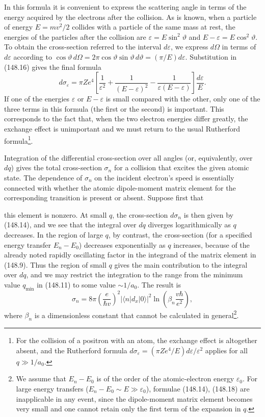 In this formula it is convenient to express the scattering angle in terms of
the energy acquired by the electrons after the collision. As is known, when a
particle of energy $E=mv^2/2$ collides with a particle of the same mass at
rest, the energies of the particles after the collision are
$\varepsilon=E\sin^2\vartheta$ and $E-\varepsilon=E\cos^2\vartheta$. To obtain
the cross-section referred to the interval $d\varepsilon$, we express
$d\Omega$ in terms of $d\varepsilon$ according to
$\cos\vartheta\,d\Omega=2\pi\cos\vartheta\sin\vartheta\,d\vartheta
=(\pi/E)d\varepsilon$. Substitution in (148.16) gives the final formula
\begin{equation}
 d\sigma_\varepsilon=\pi Ze^4\left[\frac1{\varepsilon^2}+\frac1{(E-\varepsilon)^2}
 -\frac1{\varepsilon(E-\varepsilon)}\right]\frac{d\varepsilon}{E}.
 \tag{148.17}
\end{equation}
If one of the energies $\varepsilon$ or $E-\varepsilon$ is small compared with
the other, only one of the three terms in this formula (the first or the
second) is important. This corresponds to the fact that, when the two electron
energies differ greatly, the exchange effect is unimportant and we must return
to the usual Rutherford formula\footnote{For the collision of a positron with
an atom, the exchange effect is altogether absent, and the Rutherford formula
$d\sigma_\varepsilon=(\pi Ze^4/E)d\varepsilon/\varepsilon^2$ applies for all
$q\gg1/a_0$.}.

Integration of the differential cross-section over all angles (or,
equivalently, over $dq$) gives the total cross-section $\sigma_n$ for a
collision that excites the given atomic state. The dependence of $\sigma_n$
on the incident electron's speed is essentially connected with whether the
atomic dipole-moment matrix element for the corresponding transition is
present or absent. Suppose first that

this element is nonzero. At small $q$, the cross-section $d\sigma_n$ is then
given by (148.14), and we see that the integral over $dq$ diverges
logarithmically as $q$ decreases. In the region of large $q$, by contrast, the
cross-section (for a specified energy transfer $E_n-E_0$) decreases
exponentially as $q$ increases, because of the already noted rapidly
oscillating factor in the integrand of the matrix element in (148.9). Thus the
region of small $q$ gives the main contribution to the integral over $dq$, and
we may restrict the integration to the range from the minimum value
$q_{\min}$ in (148.11) to some value $\sim1/a_0$. The result is
\begin{equation}
 \sigma_n=8\pi\left(\frac{e}{\hbar v}\right)^2|\langle n|d_x|0\rangle|^2
 \ln\left(\beta_n\frac{v\hbar}{e^2}\right),
 \tag{148.18}
\end{equation}
where $\beta_n$ is a dimensionless constant that cannot be calculated in
general\footnote{We assume that $E_n-E_0$ is of the order of the atomic-electron
energy $\varepsilon_0$. For large energy transfers
($E_n-E_0\sim E\gg\varepsilon_0$), formulae (148.14), (148.18) are inapplicable
in any event, since the dipole-moment matrix element becomes very small and
one cannot retain only the first term of the expansion in $q$.}.

